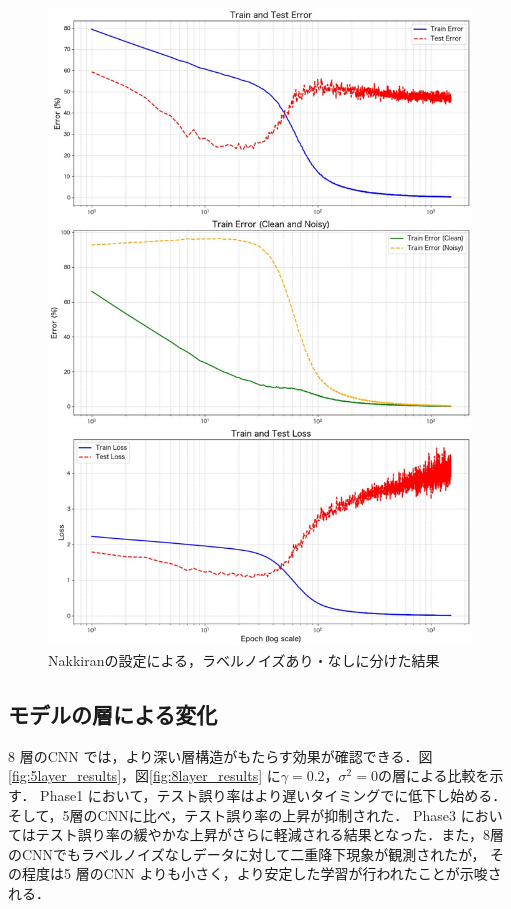 \begin{figure}
    \centering
    \includegraphics[width=\linewidth]{fig/nakkiran_resnet18_clean_noisy.pdf}
    \caption{Nakkiranの設定による，ラベルノイズあり・なしに分けた結果}
    \label{fig:nakkiran_resnet18_clean_noisy}
\end{figure}

\newpage

\subsection{モデルの層による変化}
8 層のCNN では，より深い層構造がもたらす効果が確認できる．図\ref{fig:5layer_results}，図\ref{fig:8layer_results}
に$\gamma = 0.2，\sigma^2 = 0$の層による比較を示す．
Phase1 において，テスト誤り率はより遅いタイミングでに低下し始める．そして，5層のCNNに比べ，テスト誤り率の上昇が抑制された．
Phase3 においてはテスト誤り率の緩やかな上昇がさらに軽減される結果となった．また，8層のCNNでもラベルノイズなしデータに対して二重降下現象が観測されたが，
その程度は5 層のCNN よりも小さく，より安定した学習が行われたことが示唆される．

